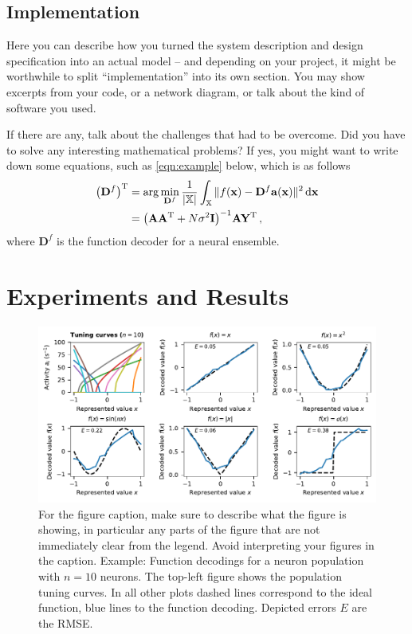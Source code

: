 \documentclass[12pt,letterpaper,oneside]{article}
\renewcommand{\vec}[1]{{\mathbf{#1}}}
\newcommand{\mat}[1]{{\mathbf{#1}}}
\newcommand{\T}{\ensuremath{\mathrm{T}}}
\begin{document}
	\subsection{Implementation}

	Here you can describe how you turned the system description and design specification into an actual model -- and depending on your project, it might be worthwhile to split \enquote{implementation} into its own section. You may show excerpts from your code, or a network diagram, or talk about the kind of software you used.

	If there are any, talk about the challenges that had to be overcome. Did you have to solve any interesting mathematical problems? If yes, you might want to write down some equations, such as \cref{eqn:example} below, which is as follows
	\begin{align}
		\big(\mat D^f\big)^\T &=  \arg\min_{\mat D^f} \frac{1}{|\mathbb{X}|} \int_{\mathbb{X}}  \| f(\vec x) - \mat D^f \vec a(\vec x)\|^2 \, \mathrm{d}\vec x \notag \\
			&= \big(\mat A \mat A^\T + N \sigma^2 \mat I \big)^{-1} \mat A \mat Y^\T \,,
		\label{eqn:example}
	\end{align}
	where $\mat D^f$ is the function decoder for a neural ensemble.

	\section{Experiments and Results}

	\begin{figure}
		\centering
		\includegraphics{media/function_decodings_10.pdf}
		\caption{For the figure caption, make sure to describe what the figure is showing, in particular any parts of the figure that are not immediately clear from the legend. Avoid interpreting your figures in the caption. Example: Function decodings for a neuron population with $n = 10$ neurons. The top-left figure shows the population tuning curves. In all other plots dashed lines correspond to the ideal function, blue lines to the function decoding. Depicted errors $E$ are the RMSE.}
		\label{fig:function_decodings_10.pdf}
	\end{figure}
\end{document}
